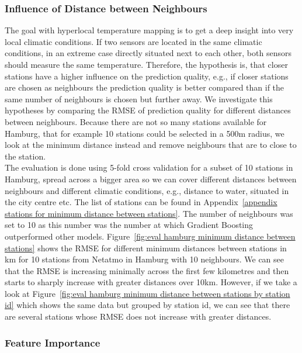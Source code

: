 \subsubsection{Influence of Distance between Neighbours}

The goal with hyperlocal temperature mapping is to get a deep insight into very local climatic conditions. If two sensors are located in the same climatic conditions, in an extreme case directly situated next to each other, both sensors should measure the same temperature. Therefore, the hypothesis is, that closer stations have a higher influence on the prediction quality, e.g., if closer stations are chosen as neighbours the prediction quality is better compared than if the same number of neighbours is chosen but further away. We investigate this hypotheses by comparing the RMSE of prediction quality for different distances between neighbours. Because there are not so many stations available for Hamburg, that for example 10 stations could be selected in a 500m radius, we look at the minimum distance instead and remove neighbours that are to close to the station.\\
The evaluation is done using 5-fold cross validation for a subset of 10 stations in Hamburg, spread across a bigger area so we can cover different distances between neighbours and different climatic conditions, e.g., distance to water, situated in the city centre etc. The list of stations can be found in Appendix~\ref{appendix stations for minimum distance between stations}. The number of neighbours was set to 10 as this number was the number at which Gradient Boosting outperformed other models. Figure~\ref{fig:eval hamburg minimum distance between stations} shows the RMSE for different minimum distances between stations in km for 10 stations from Netatmo in Hamburg with 10 neighbours. We can see that the RMSE is increasing minimally across the first few kilometres and then starts to sharply increase with greater distances over 10km. However, if we take a look at Figure~\ref{fig:eval hamburg minimum distance between stations by station id} which shows the same data but grouped by station id, we can see that there are several stations whose RMSE does not increase with greater distances.\\ %

\subsubsection{Feature Importance}

